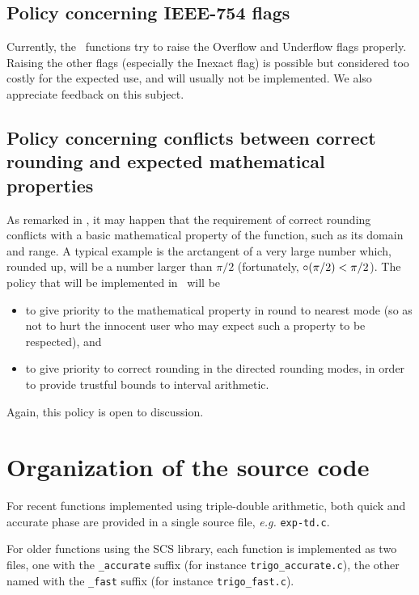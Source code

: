 \subsection{Policy concerning IEEE-754 flags}

Currently, the \crlibm\ functions try to raise the Overflow and
Underflow flags properly. Raising the other flags (especially the
Inexact flag) is possible but considered too costly for the expected
use, and will usually not be implemented. We also appreciate feedback
on this subject.

\subsection{Policy concerning conflicts between correct rounding and
  expected mathematical properties}
As remarked in \cite{DefHanLefMulRevZim2004}, it may happen that the
requirement of correct rounding conflicts with a basic mathematical
property of the function, such as its domain and range. A typical
example is the arctangent of a very large number which, rounded up,
will be a number larger than $\pi/2$ (fortunately, $\circ(\pi/2) <
\pi/2$). The policy that will be implemented in \crlibm\ will be
\begin{itemize}
\item to give priority to the mathematical property in round to
  nearest mode (so as not to hurt the innocent user who may expect
  such a property to be respected), and 
\item to give priority to correct rounding in the directed rounding
  modes, in order to provide trustful bounds to interval arithmetic.
\end{itemize}

Again, this policy is open to discussion.

\section{Organization of the source code}

For recent functions implemented using triple-double arithmetic, both
quick and accurate phase are provided in a single source file,
\emph{e.g.} \texttt{exp-td.c}.

For older functions using the SCS library, each function is
implemented as two files, one with the \texttt{\_accurate} suffix (for
instance \texttt{trigo\_accurate.c}), the other named with the
\texttt{\_fast} suffix (for instance \texttt{trigo\_fast.c}).

